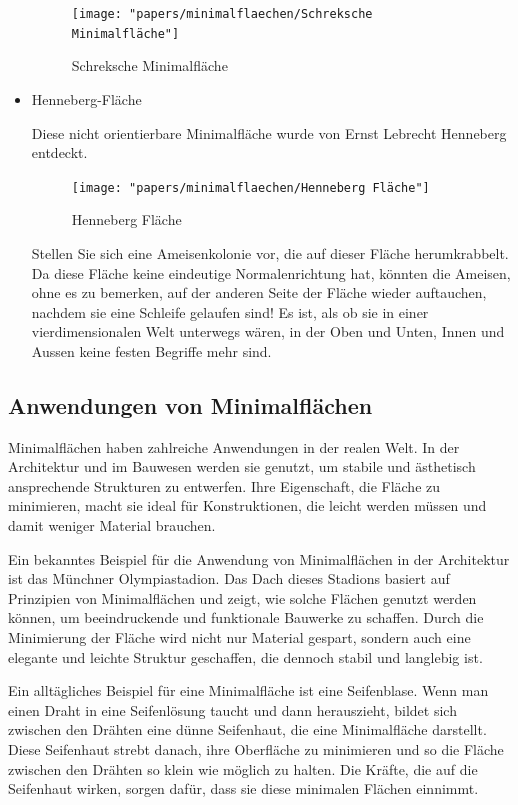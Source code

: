 \begin{itemize}
\begin{figure}
	\centering
	\texttt{[image: "papers/minimalflaechen/Schreksche Minimalfläche"]}
	\caption{Schreksche Minimalfläche}
	\label{fig:schreksche-minimalflache}
\end{figure}
	\item
	Henneberg-Fläche
	
	Diese nicht orientierbare Minimalfläche wurde von Ernst Lebrecht Henneberg entdeckt.
\begin{figure}
	\centering
	\texttt{[image: "papers/minimalflaechen/Henneberg Fläche"]}
	\caption{Henneberg Fläche}
	\label{fig:henneberg-flache}
\end{figure}

Stellen Sie sich eine Ameisenkolonie vor, die auf dieser Fläche herumkrabbelt.
Da diese Fläche keine eindeutige Normalenrichtung hat, könnten die Ameisen, ohne es zu bemerken, auf der anderen Seite der Fläche wieder auftauchen, nachdem sie eine Schleife gelaufen sind!
Es ist, als ob sie in einer vierdimensionalen Welt unterwegs wären, in der Oben und Unten, Innen und Aussen keine festen Begriffe mehr sind.


\end{itemize}

\subsection{Anwendungen von Minimalflächen
	\label{minimalflaechen:subsection:Anwendungen von Minimalflächen}}
Minimalflächen haben zahlreiche Anwendungen in der realen Welt.
In der Architektur und im Bauwesen werden sie genutzt, um stabile und ästhetisch ansprechende Strukturen zu entwerfen.
Ihre Eigenschaft, die Fläche zu minimieren, macht sie ideal für Konstruktionen, die leicht werden müssen und damit weniger Material brauchen.

Ein bekanntes Beispiel für die Anwendung von Minimalflächen in der Architektur ist das Münchner Olympiastadion.
Das Dach dieses Stadions basiert auf Prinzipien von Minimalflächen und zeigt, wie solche Flächen genutzt werden können, um beeindruckende und funktionale Bauwerke zu schaffen.
Durch die Minimierung der Fläche wird nicht nur Material gespart, sondern auch eine elegante und leichte Struktur geschaffen, die dennoch stabil und langlebig ist.

Ein alltägliches Beispiel für eine Minimalfläche ist eine Seifenblase.
Wenn man einen Draht in eine Seifenlösung taucht und dann herauszieht, bildet sich zwischen den Drähten eine dünne Seifenhaut, die eine Minimalfläche darstellt.
Diese Seifenhaut strebt danach, ihre Oberfläche zu minimieren und so die Fläche zwischen den Drähten so klein wie möglich zu halten.
Die Kräfte, die auf die Seifenhaut wirken, sorgen dafür, dass sie diese minimalen Flächen einnimmt.

